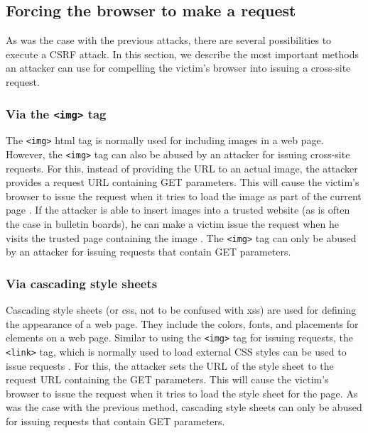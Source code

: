 \subsection{Forcing the browser to make a request}\label{forcing-request}

As was the case with the previous attacks, there are several possibilities to execute a CSRF attack. In this section, we describe the most important methods an attacker can use for compelling the victim's browser into issuing a cross-site request.

\subsubsection{Via the \texttt{<img>} tag}

The \texttt{<img>} \gls{html} tag is normally used for including images in a web page. However, the \texttt{<img>} tag can also be abused by an attacker for issuing cross-site requests. For this, instead of providing the URL to an actual image, the attacker provides a request URL containing GET parameters. This will cause the victim's browser to issue the request when it tries to load the image as part of the current page \cite{Johns2006b}. If the attacker is able to insert images into a trusted website (as is often the case in bulletin boards), he can make a victim issue the request when he visits the trusted page containing the image \cite{Barth2008}. The \texttt{<img>} tag can only be abused by an attacker for issuing requests that contain GET parameters.

\subsubsection{Via cascading style sheets}

Cascading style sheets (or \gls{css}, not to be confused with \gls{xss}) are used for defining the appearance of a web page. They include the colors, fonts, and placements for elements on a web page. Similar to using the \texttt{<img>} tag for issuing requests, the \texttt{<link>} tag, which is normally used to load external CSS styles can be used to issue requests \cite{Huang2010}. For this, the attacker sets the URL of the style sheet to the request URL containing the GET parameters. This will cause the victim's browser to issue the request when it tries to load the style sheet for the page. As was the case with the previous method, cascading style sheets can only be abused for issuing requests that contain GET parameters.

